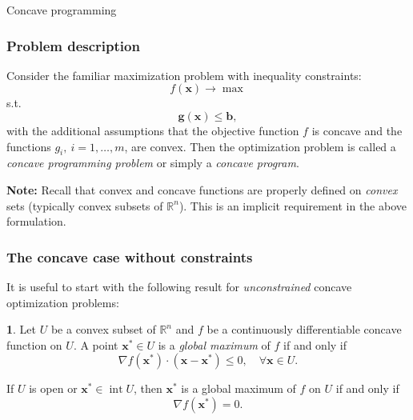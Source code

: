 \documentclass[10pt]{beamer}
\DeclareMathOperator*{\interior}{int}
\theoremstyle{definition}
\newtheorem{Fact}{\translate{Fact}}
\begin{document}
\begin{section}{Concave programming}\label{sec:concave}

\begin{frame}[fragile]
\frametitle{Problem description}
Consider the familiar maximization problem with inequality constraints:
\begin{equation}
f(\mathbf{x}) \rightarrow \max
\label{eq:objconc}
\end{equation}
s.t. \begin{equation}
\mathbf{g}(\mathbf{x})\leq \mathbf{b},
\label{eq:constrconc}
\end{equation}
with the additional assumptions that the objective function $ f $ is concave and the functions $ g_i, ~i=1,\ldots,m $, are convex. Then the optimization problem is called a \emph{concave programming problem} or simply a \emph{concave program}.\bigskip

\textbf{Note:} Recall that convex and concave functions are properly defined on \emph{convex} sets (typically convex subsets of $ \mathbb{R}^n $). This is an implicit requirement in the above formulation.
\end{frame}

\begin{frame}[fragile]
\frametitle{The concave case without constraints}
It is useful to start with the following result for \emph{unconstrained} concave optimization problems:
\begin{Fact}
Let $ U $ be a convex subset of $ \mathbb{R}^n $ and $ f $ be a continuously differentiable concave function on $ U $. A point $ \mathbf{x^*} \in U $ is a \emph{global maximum} of $ f $ if and only if \[ \nabla f(\mathbf{x^*})\cdot (\mathbf{x}-\mathbf{x^*}) \leq 0,\quad \forall \mathbf{x} \in U. \]

If $ U $ is open or $ \mathbf{x^*} \in \interior U$, then $ \mathbf{x^*} $ is a global maximum of $ f $ on $ U $ if and only if \[  \nabla f(\mathbf{x^*}) = 0. \]
\label{fc:ConcaveUnconstr}
\end{Fact}
\end{frame}


\end{section}
\end{document}
